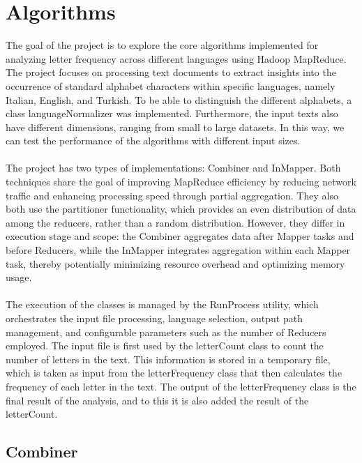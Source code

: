 \chapter{Algorithms}


The goal of the project is to explore the core algorithms implemented for analyzing letter frequency across different languages using Hadoop MapReduce. 
The project focuses on processing text documents to extract insights into the occurrence of standard alphabet characters within specific languages, namely Italian, English, and Turkish. 
To be able to distinguish the different alphabets, a class languageNormalizer was implemented. Furthermore, the input texts also have different
dimensions, ranging from small to large datasets. In this way, we can test the performance of the algorithms with different input sizes. \\ \\
The project has two types of implementations: Combiner and InMapper. Both techniques share the goal of improving MapReduce efficiency by
reducing network traffic and enhancing processing speed through partial aggregation. They also both use the partitioner functionality, 
which provides an even distribution of data among the reducers, rather than a random distribution. However, they differ in execution
stage and scope: the Combiner aggregates data after Mapper tasks and before Reducers, while the InMapper integrates aggregation within
each Mapper task, thereby potentially minimizing resource overhead and optimizing memory usage. \\ \\
The execution of the classes is managed by the RunProcess utility, which orchestrates the input file processing, language selection,
output path management, and configurable parameters such as the number of Reducers employed. The input file is first used by the
letterCount class to count the number of letters in the text. This information is stored in a temporary file, which is taken as input
from the letterFrequency class that then calculates the frequency of each letter in the text. The output of the letterFrequency class
is the final result of the analysis, and to this it is also added the result of the letterCount.

\section{Combiner}

